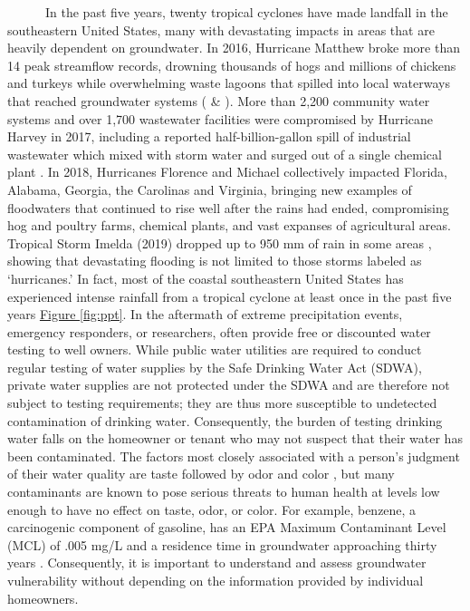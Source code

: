 \documentclass[
]{book}
\begin{document}
~~~~~~In the past five years, twenty tropical cyclones have made landfall in the southeastern United States, many with devastating impacts in areas that are heavily dependent on groundwater. In 2016, Hurricane Matthew broke more than 14 peak streamflow records, drowning thousands of hogs and millions of chickens and turkeys while overwhelming waste lagoons that spilled into local waterways that reached groundwater systems (\citet{robbins2016} \& \citet{porter2017}). More than 2,200 community water systems and over 1,700 wastewater facilities were compromised by Hurricane Harvey in 2017, including a reported half-billion-gallon spill of industrial wastewater which mixed with storm water and surged out of a single chemical plant \citep{bajak2018}. In 2018, Hurricanes Florence and Michael collectively impacted Florida, Alabama, Georgia, the Carolinas and Virginia, bringing new examples of floodwaters that continued to rise well after the rains had ended, compromising hog and poultry farms, chemical plants, and vast expanses of agricultural areas. Tropical Storm Imelda (2019) dropped up to 950 mm of rain in some areas \citep{R-prism}, showing that devastating flooding is not limited to those storms labeled as `hurricanes.' In fact, most of the coastal southeastern United States has experienced intense rainfall from a tropical cyclone at least once in the past five years \protect\hyperlink{fig:ppt}{Figure \ref{fig:ppt}}. In the aftermath of extreme precipitation events, emergency responders, or researchers, often provide free or discounted water testing to well owners. While public water utilities are required to conduct regular testing of water supplies by the Safe Drinking Water Act (SDWA), private water supplies are not protected under the SDWA and are therefore not subject to testing requirements; they are thus more susceptible to undetected contamination of drinking water. Consequently, the burden of testing drinking water falls on the homeowner or tenant who may not suspect that their water has been contaminated. The factors most closely associated with a person's judgment of their water quality are taste followed by odor and color \citep{defranca2010}, but many contaminants are known to pose serious threats to human health at levels low enough to have no effect on taste, odor, or color. For example, benzene, a carcinogenic component of gasoline, has an EPA Maximum Contaminant Level (MCL) of .005 mg/L and a residence time in groundwater approaching thirty years \citep{molson2002}. Consequently, it is important to understand and assess groundwater vulnerability without depending on the information provided by individual homeowners.
\end{document}
